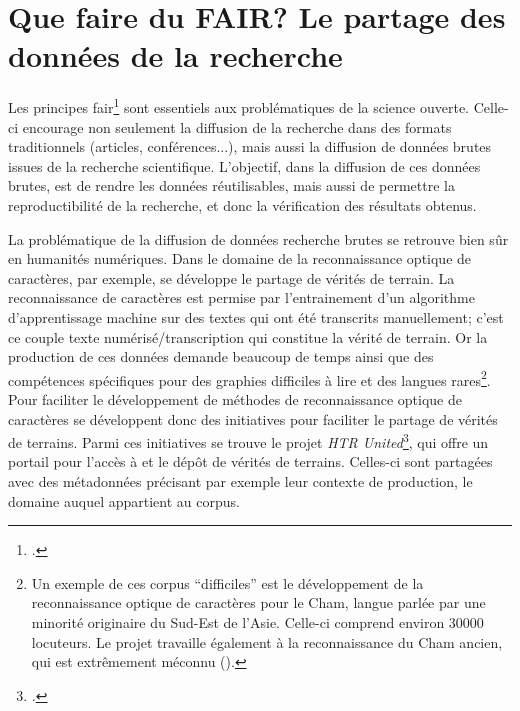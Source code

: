
\section{Que faire du FAIR? Le partage des données de la recherche}
Les principes \gls{fair}\footcite{boeckhout_fair_2018} sont essentiels aux problématiques de la science ouverte. Celle-ci encourage non seulement la diffusion de la recherche dans des formats traditionnels (articles, conférences...), mais aussi la diffusion de données brutes issues de la recherche scientifique. L'objectif, dans la diffusion de ces données brutes, est de rendre les données réutilisables, mais aussi de permettre la reproductibilité de la recherche, et donc la vérification des résultats obtenus. 

La problématique de la diffusion de données recherche brutes se retrouve bien sûr en humanités numériques. Dans le domaine de la reconnaissance optique de caractères, par exemple, se développe le partage de vérités de terrain. La reconnaissance de caractères est permise par l'entrainement d'un algorithme d'apprentissage machine sur des textes qui ont été transcrits manuellement; c'est ce couple texte numérisé/transcription qui constitue la vérité de terrain. Or la production de ces données demande beaucoup de temps ainsi que des compétences spécifiques pour des graphies difficiles à lire et des langues rares\footnote{Un exemple de ces corpus \enquote{difficiles} est le développement de la reconnaissance optique de caractères pour le Cham, langue parlée par une minorité originaire du Sud-Est de l'Asie. Celle-ci comprend environ 30000 locuteurs. Le projet travaille également à la reconnaissance du Cham ancien, qui est extrêmement méconnu (\cite{schweyer_analyse_2022}).}. Pour faciliter le développement de méthodes de reconnaissance optique de caractères se développent donc des initiatives pour faciliter le partage de vérités de terrains. Parmi ces initiatives se trouve le projet \textit{HTR United}\footcite{chague_sharing_2022}, qui offre un portail pour l'accès à et le dépôt de vérités de terrains. Celles-ci sont partagées avec des métadonnées précisant par exemple leur contexte de production, le domaine auquel appartient au corpus.

